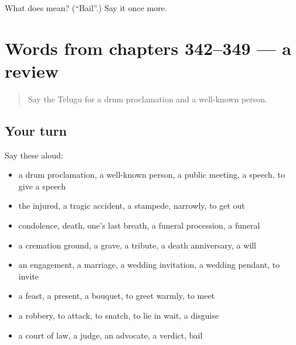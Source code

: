 \begin{tcolorbox}[breakable,colback=teal!4,colframe=teal!35!black,title={Before you move on}]
What does  mean? (\textquotedblleft{}Bail\textquotedblright{}.) Say it once more.
\end{tcolorbox}
\section[(dialogue)]{Words from chapters 342–349 — a review}

\label{lesson:TE-R349-review-342-349}



\begin{quote}
Say the Telugu for a drum proclamation and a well-known person.
\end{quote}

\subsection*{Your turn}
Say these aloud:

\begin{itemize}
\raggedright
  \item a drum proclamation, a well-known person, a public meeting, a speech, to give a speech
  \item the injured, a tragic accident, a stampede, narrowly, to get out
  \item condolence, death, one's last breath, a funeral procession, a funeral
  \item a cremation ground, a grave, a tribute, a death anniversary, a will
  \item an engagement, a marriage, a wedding invitation, a wedding pendant, to invite
  \item a feast, a present, a bouquet, to greet warmly, to meet
  \item a robbery, to attack, to snatch, to lie in wait, a disguise
  \item a court of law, a judge, an advocate, a verdict, bail
\end{itemize}

